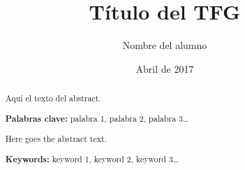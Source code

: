 \documentclass[a4paper, 12pt]{report} %
\author{Nombre del alumno}
\date{Abril de 2017}
\title{Título del TFG}
\begin{document}

    \maketitle
    \tableofcontents
    \listoffigures
    \listoftables

    \begin{abstract}
      \normalsize
      Aquí el texto del abstract.

      \textbf{Palabras clave:} palabra 1, palabra 2, palabra 3\ldots
    \end{abstract}

    \begin{otherlanguage}{english}
      \begin{abstract}
        \normalsize
        Here goes the abstract text.

        \textbf{Keywords:} keyword 1, keyword 2, keyword 3\ldots
      \end{abstract}
    \end{otherlanguage}
    \newpage


    
    

\printbibliography[heading=bibnumbered] %
\end{document}
